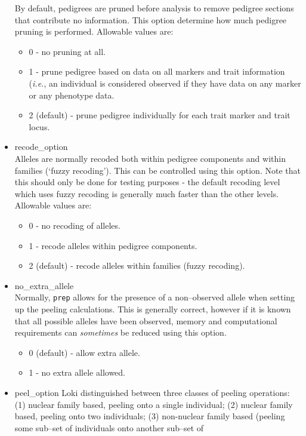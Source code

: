 \documentclass[10pt,a4paper]{article}
\newcommand{\IE}{\textit{i.e.},\xspace}
\newcommand{\Prep}{\texttt{prep}\xspace}
\begin{document}
\begin{itemize}
	 By default, pedigrees are pruned before analysis to remove pedigree sections
	 that contribute no information.  This option determine how much pedigree
	 pruning is performed.  Allowable values are:
	 \begin{itemize}
		\item 0 - no pruning at all.
		\item 1 - prune pedigree based on data on all markers and trait
		  information (\IE an individual is considered observed if they have data on
		  any marker or any phenotype data.
		\item 2 (default) - prune pedigree individually for each trait marker
		  and trait locus.
	 \end{itemize}
  \item recode\_option\\
	 Alleles are normally recoded both within pedigree components and within
	 families (`fuzzy recoding').  This can be controlled using this option.
	 Note that this should only be done for testing purposes - the default
	 recoding level which uses fuzzy recoding is generally much faster than
	 the other levels.  Allowable values are:
	 \begin{itemize}
		\item 0 - no recoding of alleles.
		\item 1 - recode alleles within pedigree components.
		\item 2 (default) - recode alleles within families (fuzzy recoding).
	 \end{itemize}
  \item no\_extra\_allele\\
	 Normally, \Prep allows for the presence of a non--observed allele when
	 setting up the peeling calculations.  This is generally correct, however
	 if it is known  that all possible alleles have been observed, memory and
	 computational requirements can \emph{sometimes} be reduced using this option.
	 \begin{itemize}
		\item 0 (default) - allow extra allele.
		\item 1 - no extra allele allowed.
	 \end{itemize}
	\item peel\_option
	  Loki distinguished between three classes of peeling operations: (1)
	  nuclear family based, peeling onto a single individual; (2) nuclear
	  family based, peeling onto two individuals; (3) non-nuclear family
	  based (peeling some sub--set of individuals onto another sub--set of

\end{itemize}
\end{document}
